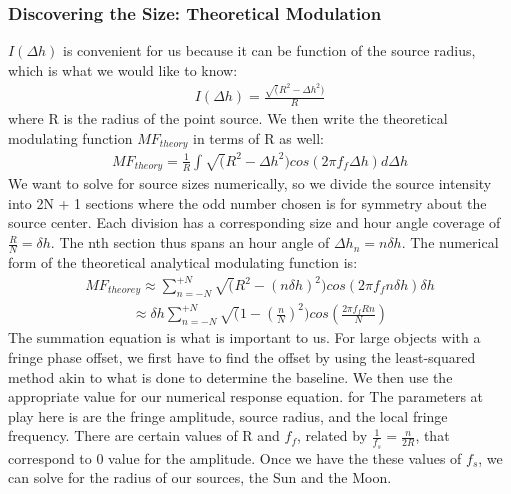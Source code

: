 \documentclass{article}
\begin{document}
\subsubsection{Discovering the Size: Theoretical Modulation}
$I(\Delta h)$ is convenient for us because it can be function of the source radius, which
is what we would like to know:
\begin{align}I(\Delta h) = \frac{\sqrt(R^{2}-\Delta h^{2})}{R}
\end{align}
where R is the radius of the point source. We then write the theoretical
modulating function $MF_{theory}$ in terms of R as well:
\begin{align}MF_{theory} = \frac{1}{R}\int{\sqrt(R^{2}-\Delta h^{2})cos(2\pi
    f_{f}\Delta h) d\Delta h}
\end{align} 
We want to solve for source sizes numerically, so we divide the source
intensity into 2N + 1 sections where the odd number chosen is for
symmetry about the source center. Each division has a corresponding size
and hour angle coverage of $\frac{R}{N} = \delta h$. The nth section
thus spans an hour angle of $\Delta h_{n} = n\delta h$. The numerical
form of the theoretical analytical modulating function is:
\begin{align}MF_{theorey} \approx \sum\limits_{n=-N}^{+N} \sqrt(R^{2} -
  (n\delta h)^{2})cos(2\pi{f_{f}}n\delta h) \delta h
\end{align}
\begin{align}\approx \delta
  h\sum\limits_{n=-N}^{+N}\sqrt(1-(\frac{n}{N})^{2})cos(\frac{2\pi
    f_{f}Rn}{N})  
\end{align}
The summation equation is what is important to us. For large objects
with a fringe phase offset, we first have to find the offset by using
the least-squared method akin to what is done to determine the
baseline. We then use the appropriate value for our numerical response
equation. for The parameters at play here is are the fringe amplitude,
source radius, and the local fringe frequency. There are certain values
of R and $f_{f}$, related by $\frac{1}{f_{s}} = \frac{n}{2R}$, that
correspond to 0 value for the amplitude. Once we have the these values
of $f_{s}$, we can solve for the radius of our sources, the Sun and the
Moon.  
\end{document}
